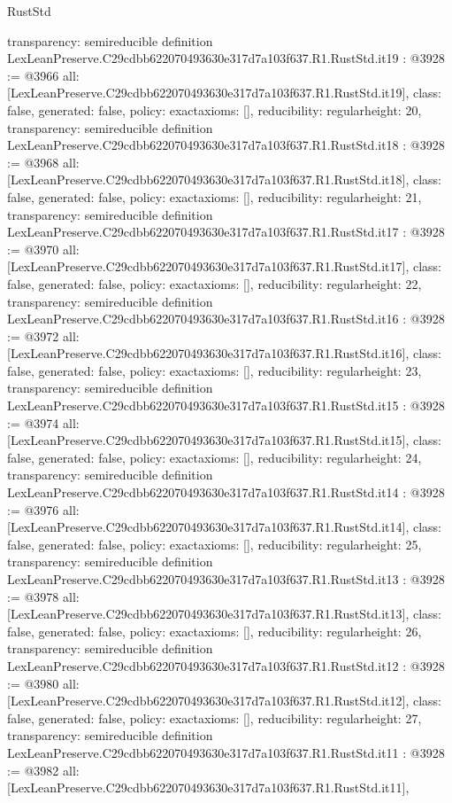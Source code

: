 \begin{lexlean}{RustStd}
\begin{coremodule}
{  transparency: semireducible
}
definition LexLeanPreserve.C29cdbb622070493630e317d7a103f637.R1.RustStd.it19 : @3928 := @3966 {
  all: [LexLeanPreserve.C29cdbb622070493630e317d7a103f637.R1.RustStd.it19],
  class: false,
  generated: false,
  policy: exact{axioms: []},
  reducibility: regular{height: 20},
  transparency: semireducible
}
definition LexLeanPreserve.C29cdbb622070493630e317d7a103f637.R1.RustStd.it18 : @3928 := @3968 {
  all: [LexLeanPreserve.C29cdbb622070493630e317d7a103f637.R1.RustStd.it18],
  class: false,
  generated: false,
  policy: exact{axioms: []},
  reducibility: regular{height: 21},
  transparency: semireducible
}
definition LexLeanPreserve.C29cdbb622070493630e317d7a103f637.R1.RustStd.it17 : @3928 := @3970 {
  all: [LexLeanPreserve.C29cdbb622070493630e317d7a103f637.R1.RustStd.it17],
  class: false,
  generated: false,
  policy: exact{axioms: []},
  reducibility: regular{height: 22},
  transparency: semireducible
}
definition LexLeanPreserve.C29cdbb622070493630e317d7a103f637.R1.RustStd.it16 : @3928 := @3972 {
  all: [LexLeanPreserve.C29cdbb622070493630e317d7a103f637.R1.RustStd.it16],
  class: false,
  generated: false,
  policy: exact{axioms: []},
  reducibility: regular{height: 23},
  transparency: semireducible
}
definition LexLeanPreserve.C29cdbb622070493630e317d7a103f637.R1.RustStd.it15 : @3928 := @3974 {
  all: [LexLeanPreserve.C29cdbb622070493630e317d7a103f637.R1.RustStd.it15],
  class: false,
  generated: false,
  policy: exact{axioms: []},
  reducibility: regular{height: 24},
  transparency: semireducible
}
definition LexLeanPreserve.C29cdbb622070493630e317d7a103f637.R1.RustStd.it14 : @3928 := @3976 {
  all: [LexLeanPreserve.C29cdbb622070493630e317d7a103f637.R1.RustStd.it14],
  class: false,
  generated: false,
  policy: exact{axioms: []},
  reducibility: regular{height: 25},
  transparency: semireducible
}
definition LexLeanPreserve.C29cdbb622070493630e317d7a103f637.R1.RustStd.it13 : @3928 := @3978 {
  all: [LexLeanPreserve.C29cdbb622070493630e317d7a103f637.R1.RustStd.it13],
  class: false,
  generated: false,
  policy: exact{axioms: []},
  reducibility: regular{height: 26},
  transparency: semireducible
}
definition LexLeanPreserve.C29cdbb622070493630e317d7a103f637.R1.RustStd.it12 : @3928 := @3980 {
  all: [LexLeanPreserve.C29cdbb622070493630e317d7a103f637.R1.RustStd.it12],
  class: false,
  generated: false,
  policy: exact{axioms: []},
  reducibility: regular{height: 27},
  transparency: semireducible
}
definition LexLeanPreserve.C29cdbb622070493630e317d7a103f637.R1.RustStd.it11 : @3928 := @3982 {
  all: [LexLeanPreserve.C29cdbb622070493630e317d7a103f637.R1.RustStd.it11],
}
\end{coremodule}
\end{lexlean}
